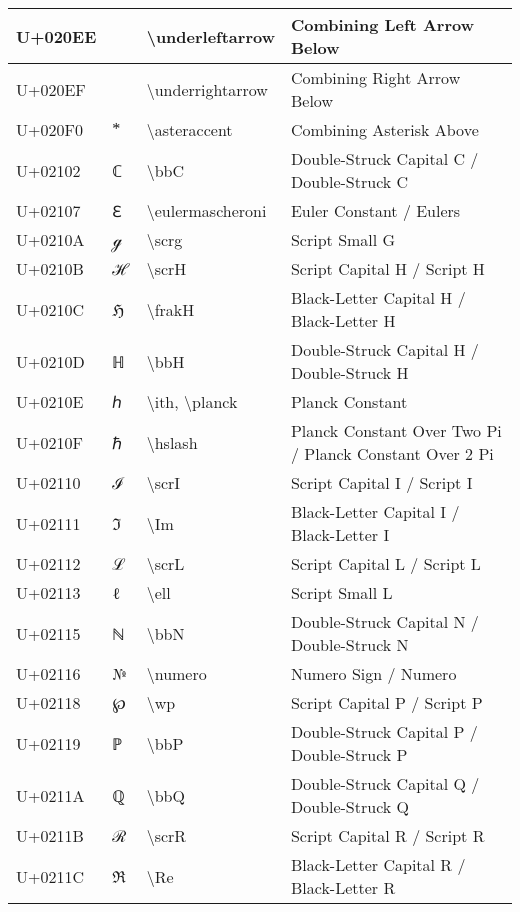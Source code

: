 \begin{table}[h]
\begin{tabulary}{\linewidth}{|L|L|L|L|}
\hline
U+020EE &  ⃮  & {\textbackslash}underleftarrow & Combining Left Arrow Below \\
\hline
U+020EF &  ⃯  & {\textbackslash}underrightarrow & Combining Right Arrow Below \\
\hline
U+020F0 &  ⃰  & {\textbackslash}asteraccent & Combining Asterisk Above \\
\hline
U+02102 & ℂ & {\textbackslash}bbC & Double-Struck Capital C / Double-Struck C \\
\hline
U+02107 & ℇ & {\textbackslash}eulermascheroni & Euler Constant / Eulers \\
\hline
U+0210A & ℊ & {\textbackslash}scrg & Script Small G \\
\hline
U+0210B & ℋ & {\textbackslash}scrH & Script Capital H / Script H \\
\hline
U+0210C & ℌ & {\textbackslash}frakH & Black-Letter Capital H / Black-Letter H \\
\hline
U+0210D & ℍ & {\textbackslash}bbH & Double-Struck Capital H / Double-Struck H \\
\hline
U+0210E & ℎ & {\textbackslash}ith, {\textbackslash}planck & Planck Constant \\
\hline
U+0210F & ℏ & {\textbackslash}hslash & Planck Constant Over Two Pi / Planck Constant Over 2 Pi \\
\hline
U+02110 & ℐ & {\textbackslash}scrI & Script Capital I / Script I \\
\hline
U+02111 & ℑ & {\textbackslash}Im & Black-Letter Capital I / Black-Letter I \\
\hline
U+02112 & ℒ & {\textbackslash}scrL & Script Capital L / Script L \\
\hline
U+02113 & ℓ & {\textbackslash}ell & Script Small L \\
\hline
U+02115 & ℕ & {\textbackslash}bbN & Double-Struck Capital N / Double-Struck N \\
\hline
U+02116 & № & {\textbackslash}numero & Numero Sign / Numero \\
\hline
U+02118 & ℘ & {\textbackslash}wp & Script Capital P / Script P \\
\hline
U+02119 & ℙ & {\textbackslash}bbP & Double-Struck Capital P / Double-Struck P \\
\hline
U+0211A & ℚ & {\textbackslash}bbQ & Double-Struck Capital Q / Double-Struck Q \\
\hline
U+0211B & ℛ & {\textbackslash}scrR & Script Capital R / Script R \\
\hline
U+0211C & ℜ & {\textbackslash}Re & Black-Letter Capital R / Black-Letter R \\

\end{tabulary}
\end{table}
